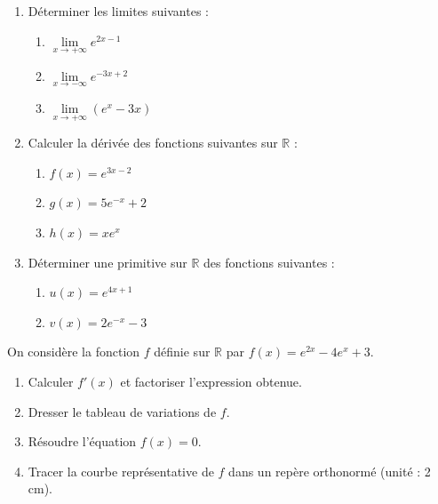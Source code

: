 \documentclass[11pt]{article}
\begin{document}
\begin{exercice}
\begin{enumerate}
    \item Déterminer les limites suivantes :
    \begin{enumerate}
        \item $\lim\limits_{x \to +\infty} e^{2x-1}$
        \item $\lim\limits_{x \to -\infty} e^{-3x+2}$
        \item $\lim\limits_{x \to +\infty} (e^{x} - 3x)$
    \end{enumerate}
    \item Calculer la dérivée des fonctions suivantes sur $\mathbb{R}$ :
    \begin{enumerate}
        \item $f(x) = e^{3x-2}$
        \item $g(x) = 5e^{-x} + 2$
        \item $h(x) = x e^{x}$
    \end{enumerate}
    \item Déterminer une primitive sur $\mathbb{R}$ des fonctions suivantes :
    \begin{enumerate}
        \item $u(x) = e^{4x+1}$
        \item $v(x) = 2e^{-x} - 3$
    \end{enumerate}
\end{enumerate}
\end{exercice}

\begin{exercice}
On considère la fonction $f$ définie sur $\mathbb{R}$ par $f(x) = e^{2x} - 4e^{x} + 3$.
\begin{enumerate}
    \item Calculer $f'(x)$ et factoriser l'expression obtenue.
    \item Dresser le tableau de variations de $f$.
    \item Résoudre l'équation $f(x) = 0$.
    \item Tracer la courbe représentative de $f$ dans un repère orthonormé (unité : 2 cm).
\end{enumerate}
\end{exercice}
\end{document}
